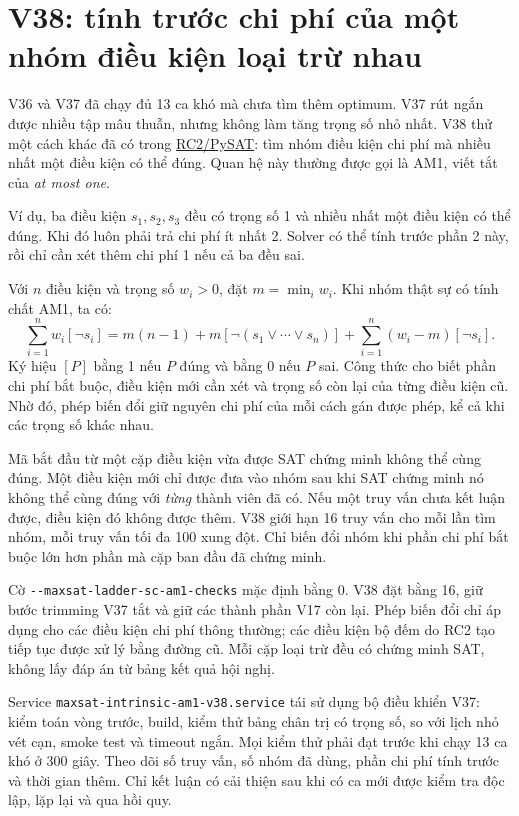 \documentclass[11pt,a4paper]{article}
\newcommand{\file}[1]{\nolinkurl{#1}}
\begin{document}
\section{V38: tính trước chi phí của một nhóm điều kiện loại trừ nhau}

V36 và V37 đã chạy đủ 13 ca khó mà chưa tìm thêm optimum. V37 rút ngắn
được nhiều tập mâu thuẫn, nhưng không làm tăng trọng số nhỏ nhất. V38 thử
một cách khác đã có trong
\href{https://pysathq.github.io/docs/html/api/examples/rc2.html\#pysat.examples.rc2.RC2.process_am1}{RC2/PySAT}:
tìm nhóm điều kiện chi phí mà nhiều nhất một điều kiện có thể đúng.
Quan hệ này thường được gọi là AM1, viết tắt của \emph{at most one}.

Ví dụ, ba điều kiện $s_1,s_2,s_3$ đều có trọng số 1 và nhiều nhất một
điều kiện có thể đúng. Khi đó luôn phải trả chi phí ít nhất 2. Solver có
thể tính trước phần 2 này, rồi chỉ cần xét thêm chi phí 1 nếu cả ba đều sai.

Với $n$ điều kiện và trọng số $w_i>0$, đặt $m=\min_i w_i$.
Khi nhóm thật sự có tính chất AM1, ta có:
\[
 \sum_{i=1}^n w_i[\neg s_i]
 =m(n-1)+m[\neg(s_1\lor\cdots\lor s_n)]
  +\sum_{i=1}^n(w_i-m)[\neg s_i].
\]
Ký hiệu $[P]$ bằng 1 nếu $P$ đúng và bằng 0 nếu $P$ sai. Công thức cho
biết phần chi phí bắt buộc, điều kiện mới cần xét và trọng số còn lại của
từng điều kiện cũ. Nhờ đó, phép biến đổi giữ nguyên chi phí của mỗi cách
gán được phép, kể cả khi các trọng số khác nhau.

Mã bắt đầu từ một cặp điều kiện vừa được SAT chứng minh không thể cùng
đúng. Một điều kiện mới chỉ được đưa vào nhóm sau khi SAT chứng minh nó
không thể cùng đúng với \emph{từng} thành viên đã có. Nếu một truy vấn
chưa kết luận được, điều kiện đó không được thêm. V38 giới hạn 16 truy
vấn cho mỗi lần tìm nhóm, mỗi truy vấn tối đa 100 xung đột. Chỉ biến đổi
nhóm khi phần chi phí bắt buộc lớn hơn phần mà cặp ban đầu đã chứng minh.

Cờ \file{--maxsat-ladder-sc-am1-checks} mặc định bằng 0. V38 đặt bằng 16,
giữ bước trimming V37 tắt và giữ các thành phần V17 còn lại. Phép biến
đổi chỉ áp dụng cho các điều kiện chi phí thông thường; các điều kiện
bộ đếm do RC2 tạo tiếp tục được xử lý bằng đường cũ. Mỗi cặp loại trừ
đều có chứng minh SAT, không lấy đáp án từ bảng kết quả hội nghị.

Service \file{maxsat-intrinsic-am1-v38.service} tái sử dụng bộ điều khiển
V37: kiểm toán vòng trước, build, kiểm thử bảng chân trị có trọng số,
so với lịch nhỏ vét cạn, smoke test và timeout ngắn. Mọi kiểm thử phải
đạt trước khi chạy 13 ca khó ở 300 giây. Theo dõi số truy vấn, số nhóm
đã dùng, phần chi phí tính trước và thời gian thêm. Chỉ kết luận có cải
thiện sau khi có ca mới được kiểm tra độc lập, lặp lại và qua hồi quy.
\end{document}
